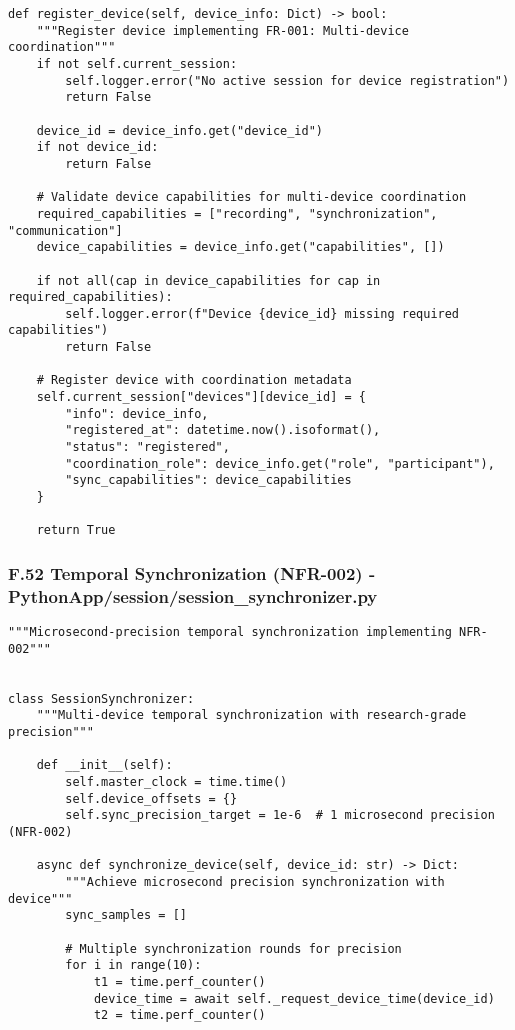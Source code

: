 \documentclass[11pt,a4paper]{report}
\begin{document}
{{\begin{verbatim}
def register_device(self, device_info: Dict) -> bool:
    """Register device implementing FR-001: Multi-device coordination"""
    if not self.current_session:
        self.logger.error("No active session for device registration")
        return False

    device_id = device_info.get("device_id")
    if not device_id:
        return False

    # Validate device capabilities for multi-device coordination
    required_capabilities = ["recording", "synchronization", "communication"]
    device_capabilities = device_info.get("capabilities", [])

    if not all(cap in device_capabilities for cap in required_capabilities):
        self.logger.error(f"Device {device_id} missing required capabilities")
        return False

    # Register device with coordination metadata
    self.current_session["devices"][device_id] = {
        "info": device_info,
        "registered_at": datetime.now().isoformat(),
        "status": "registered",
        "coordination_role": device_info.get("role", "participant"),
        "sync_capabilities": device_capabilities
    }

    return True
\end{verbatim}

\subsubsection{F.52 Temporal Synchronization (NFR-002) - PythonApp/session/session_synchronizer.py}

\begin{verbatim}
"""Microsecond-precision temporal synchronization implementing NFR-002"""


class SessionSynchronizer:
    """Multi-device temporal synchronization with research-grade precision"""

    def __init__(self):
        self.master_clock = time.time()
        self.device_offsets = {}
        self.sync_precision_target = 1e-6  # 1 microsecond precision (NFR-002)

    async def synchronize_device(self, device_id: str) -> Dict:
        """Achieve microsecond precision synchronization with device"""
        sync_samples = []

        # Multiple synchronization rounds for precision
        for i in range(10):
            t1 = time.perf_counter()
            device_time = await self._request_device_time(device_id)
            t2 = time.perf_counter()


\end{verbatim}}}
\end{document}
